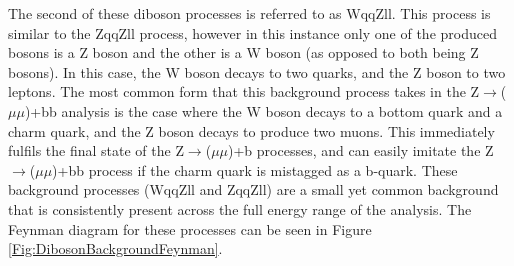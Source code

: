 \documentclass[12pt,a4paper,epsf,portrait,times,epsfig]{article}
\begin{document}
		The second of these diboson processes is referred to as WqqZll. This process is similar to the ZqqZll process, however in this instance only one of the produced bosons is a Z boson and the other is a W boson (as opposed to both being Z bosons). In this case, the W boson decays to two quarks, and	the Z boson to two leptons. The most common form that this background process takes in the Z$\rightarrow$($\mu\mu$)+bb analysis is the case where the W boson decays to a bottom quark and a charm quark, and the Z boson decays to produce two muons. This immediately fulfils the
		final state of the Z$\rightarrow$($\mu\mu$)+b processes, and can easily imitate the Z$\rightarrow$($\mu\mu$)+bb process if the charm quark is mistagged as a b-quark. These background processes (WqqZll and ZqqZll) are a small yet common background that is consistently present across the full energy range of the analysis. The Feynman diagram for these processes can be seen in Figure \ref{Fig:DibosonBackgroundFeynman}. \par
		
\end{document}
